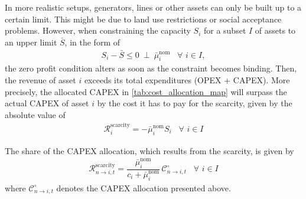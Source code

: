 \documentclass[11pt,twocolumn]{article}
\newcommand{\resultsin}[1]{\hspace{6pt} \bot  \hspace{6pt} #1}
\newcommand{\Forall}[1]{\hspace{10pt} \forall \,\, #1 }
\newcommand{\state}{s_{i,t}}
\newcommand{\capacity}{S_{i}}
\newcommand{\costfactor}{\gamma^\circ_{i,t}}
\newcommand{\capacityupper}{\bar{S}}
\newcommand{\muuppernom}{\bar{\mu}^\text{nom}_{i}}
\newcommand{\cost}[1][\circ]{\mathcal{C}^{#1}}
\newcommand{\remainingcost}{\mathcal{R}}
\newcommand{\scarcitycost}{\remainingcost^\text{scarcity}}
\newcommand{\allocatestate}[1][i, n]{A_{#1,t}}
\newcommand{\allocatecost}[1][n \rightarrow i]{\cost_{#1, t}}
\newcommand{\allocatescarcitycost}[1][n \rightarrow i]{\scarcitycost_{#1,t}}
\begin{document}
In more realistic setups, generators, lines or other assets can only be built up to a certain limit. This might be due to land use restrictions or social acceptance problems. %
However, when constraining the capacity $\capacity$  for a subset $I$ of assets to an upper limit $\capacityupper$, in the form of 
\begin{align}
    \capacity - \capacityupper \le 0 \resultsin{\muuppernom} \Forall{i \in I}
\label{eq:capacityexpansionmaximum},
\end{align}
the zero profit condition alters as soon as the constraint becomes binding. Then, the revenue of asset $i$ exceeds its total expenditures (OPEX + CAPEX). More precisely, the allocated CAPEX in \cref{tab:cost_allocation_map} will surpass the actual CAPEX of asset $i$ by the cost it has to pay for the scarcity, given by the absolute value of 
\begin{align}
    \scarcitycost_i = - \muuppernom \capacity \Forall{i \in I}
    \label{eq:scarcitycost}
\end{align}


The share of the CAPEX allocation, which results from the scarcity, is given by 
\begin{align}
    \allocatescarcitycost = \dfrac{\muuppernom}{c_i + \muuppernom} \, \allocatecost \Forall{i \in I}
\end{align}
where $\allocatecost$ denotes the CAPEX allocation presented above. 
\end{document}
